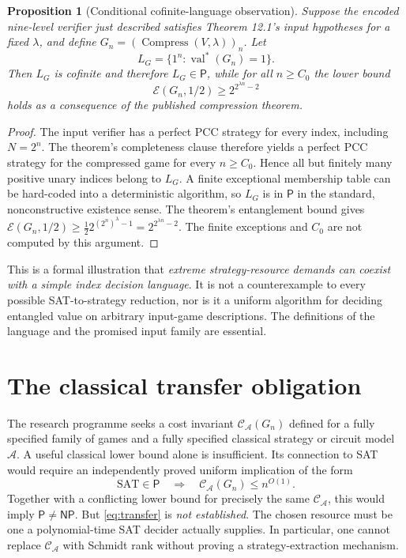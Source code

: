 \documentclass[11pt,a4paper]{article}
\newtheorem{proposition}{Proposition}
\newcommand{\Pclass}{\mathsf{P}}
\newcommand{\NPclass}{\mathsf{NP}}
\newcommand{\E}{\mathcal{E}}
\newcommand{\val}{\operatorname{val}^{*}}
\begin{document}
\begin{proposition}[Conditional cofinite-language observation]
Suppose the encoded nine-level verifier just described satisfies Theorem 12.1's input hypotheses for a fixed $\lambda$, and define $G_n=(\operatorname{Compress}(V,\lambda))_n$. Let
\begin{equation}\label{eq:unary}
L_G=\{1^n:\val(G_n)=1\}.
\end{equation}
Then $L_G$ is cofinite and therefore $L_G\in\Pclass$, while for all $n\ge C_0$ the lower bound
\begin{equation}\label{eq:double}
\E(G_n,1/2)\ge 2^{2^{\lambda n}-2}
\end{equation}
holds as a consequence of the published compression theorem.
\end{proposition}
\begin{proof}
The input verifier has a perfect PCC strategy for every index, including $N=2^n$. The theorem's completeness clause therefore yields a perfect PCC strategy for the compressed game for every $n\ge C_0$. Hence all but finitely many positive unary indices belong to $L_G$. A finite exceptional membership table can be hard-coded into a deterministic algorithm, so $L_G$ is in $\Pclass$ in the standard, nonconstructive existence sense. The theorem's entanglement bound gives $\E(G_n,1/2)\ge\frac12 2^{(2^n)^\lambda-1}=2^{2^{\lambda n}-2}$. The finite exceptions and $C_0$ are not computed by this argument.
\end{proof}

This is a formal illustration that \emph{extreme strategy-resource demands can coexist with a simple index decision language}. It is not a counterexample to every possible SAT-to-strategy reduction, nor is it a uniform algorithm for deciding entangled value on arbitrary input-game descriptions. The definitions of the language and the promised input family are essential.

\section{The classical transfer obligation}
The research programme seeks a cost invariant $\mathcal C_{\mathcal A}(G_n)$ defined for a fully specified family of games and a fully specified classical strategy or circuit model $\mathcal A$. A useful classical lower bound alone is insufficient. Its connection to SAT would require an independently proved uniform implication of the form
\begin{equation}\label{eq:transfer}
\text{SAT}\in\Pclass \quad\Longrightarrow\quad
\mathcal C_{\mathcal A}(G_n)\le n^{O(1)}.
\end{equation}
Together with a conflicting lower bound for precisely the same $\mathcal C_{\mathcal A}$, this would imply $\Pclass\ne\NPclass$. But \eqref{eq:transfer} is \emph{not established}. The chosen resource must be one a polynomial-time SAT decider actually supplies. In particular, one cannot replace $\mathcal C_{\mathcal A}$ with Schmidt rank without proving a strategy-extraction mechanism.
\end{document}
